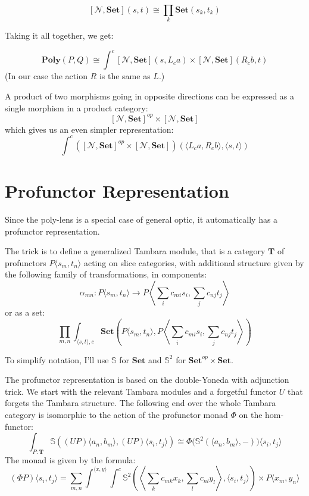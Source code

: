 \documentclass[11pt]{amsart}
\begin{document}
\[ [\mathcal{N}, \mathbf{Set}] (s, t) \cong \prod_k  \mathbf{Set} \left(s_k, t_k\right) \]

Taking it all together, we get:

\[ \mathbf{Poly}(P, Q) \cong \int^{c}   [\mathcal{N}, \mathbf{Set}]  \left(s, L_c a\right)  \times  [\mathcal{N}, \mathbf{Set}]  \left(R_c b, t\right) \]
(In our case the action $R$ is the same as $L$.)

A product of two morphisms going in opposite directions can be expressed as a single morphism in a product category:
\[[\mathcal{N}, \mathbf{Set}]^{op}\times [\mathcal{N}, \mathbf{Set}] \]
 which gives us an even simpler representation:
\[  \int^c ([\mathcal{N}, \mathbf{Set}]^{op}\times [\mathcal{N}, \mathbf{Set}]) \left(\langle   L_c a, R_c b \rangle, \langle s, t \rangle \right)\]

 
\section{Profunctor Representation}

Since the poly-lens is a special case of general optic, it automatically has a profunctor representation.

The trick is to define a generalized Tambara module, that is a category $\mathbf{T}$ of profunctors $P\langle s_m, t_n \rangle$ acting on slice categories, with additional structure given by the following family of transformations, in components:
\[\alpha_{m n} \colon P\langle s_m, t_n \rangle \to P \left \langle \sum_i c_{m i}  s_i, \sum_j c_{n j} t_j \right \rangle \]
or as a set:
\[ \prod_{m, n} \int_{ \langle s, t \rangle, c} \mathbf{Set} \left(P\langle s_m, t_n \rangle, P \left \langle \sum_i c_{m i}  s_i, \sum_j c_{n j} t_j \right \rangle \right) \]

To simplify notation, I'll use $\mathbb{S}$ for $\mathbf{Set}$ and $\mathbb{S}^2$ for $\mathbf{Set}^{op} \times \mathbf{Set}$.

The profunctor representation is based on the double-Yoneda with adjunction trick. We start with the relevant Tambara modules and a forgetful functor $U$ that forgets the Tambara structure. The following end over the whole Tambara category is isomorphic to the action of the profunctor monad $\Phi$ on the hom-functor:
\[ \int_{P \colon \mathbf{T}} \mathbb{S}\left ( (U P)\langle a_n, b_m \rangle, (U P) \langle s_i, t_j \rangle \right) \cong \Phi \big( \mathbb{S}^2(\langle a_n, b_m \rangle, -) \big)  \langle s_i, t_j \rangle \]
The monad is given by the formula:
\[ (\Phi P) \langle s_i, t_j \rangle = \sum_{m, n} \int^{\langle x, y \rangle} \int^{c}  
    \mathbb{S}^2
      \left(\left \langle \sum_k c_{m k}  x_k
    , \sum_l c_{n l} y_l \right \rangle,  
        \langle s_i, t_j \rangle \right)
     \times  P\langle x_m, y_n \rangle\]
\end{document}
